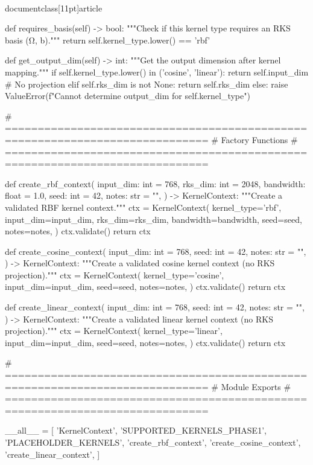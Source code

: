 \\documentclass[11pt]{article}
\begin{document}
\begin{CodeBlock}
    def requires_basis(self) -> bool:
        """Check if this kernel type requires an RKS basis (Ω, b)."""
        return self.kernel_type.lower() == 'rbf'
    
    def get_output_dim(self) -> int:
        """Get the output dimension after kernel mapping."""
        if self.kernel_type.lower() in ('cosine', 'linear'):
            return self.input_dim  # No projection
        elif self.rks_dim is not None:
            return self.rks_dim
        else:
            raise ValueError(f"Cannot determine output_dim for {self.kernel_type}")


# =============================================================================
# Factory Functions
# =============================================================================

def create_rbf_context(
    input_dim: int = 768,
    rks_dim: int = 2048,
    bandwidth: float = 1.0,
    seed: int = 42,
    notes: str = "",
) -> KernelContext:
    """Create a validated RBF kernel context."""
    ctx = KernelContext(
        kernel_type='rbf',
        input_dim=input_dim,
        rks_dim=rks_dim,
        bandwidth=bandwidth,
        seed=seed,
        notes=notes,
    )
    ctx.validate()
    return ctx


def create_cosine_context(
    input_dim: int = 768,
    seed: int = 42,
    notes: str = "",
) -> KernelContext:
    """Create a validated cosine kernel context (no RKS projection)."""
    ctx = KernelContext(
        kernel_type='cosine',
        input_dim=input_dim,
        seed=seed,
        notes=notes,
    )
    ctx.validate()
    return ctx


def create_linear_context(
    input_dim: int = 768,
    seed: int = 42,
    notes: str = "",
) -> KernelContext:
    """Create a validated linear kernel context (no RKS projection)."""
    ctx = KernelContext(
        kernel_type='linear',
        input_dim=input_dim,
        seed=seed,
        notes=notes,
    )
    ctx.validate()
    return ctx


# =============================================================================
# Module Exports
# =============================================================================

__all__ = [
    'KernelContext',
    'SUPPORTED_KERNELS_PHASE1',
    'PLACEHOLDER_KERNELS',
    'create_rbf_context',
    'create_cosine_context',
    'create_linear_context',
]

\end{CodeBlock}
\end{document}
